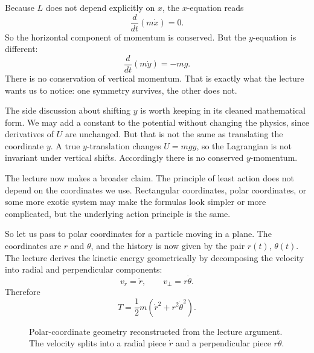 Because \(L\) does not depend explicitly on \(x\), the \(x\)-equation reads
\begin{equation}
\frac{d}{dt}(m\dot x)=0.
\end{equation}
So the horizontal component of momentum is conserved. But the \(y\)-equation is different:
\begin{equation}
\frac{d}{dt}(m\dot y)=-mg.
\end{equation}
There is no conservation of vertical momentum. That is exactly what the lecture wants us to notice: one symmetry survives, the other does not.

The side discussion about shifting \(y\) is worth keeping in its cleaned mathematical form. We may add a constant to the potential without changing the physics, since derivatives of \(U\) are unchanged. But that is not the same as translating the coordinate \(y\). A true \(y\)-translation changes \(U=mgy\), so the Lagrangian is not invariant under vertical shifts. Accordingly there is no conserved \(y\)-momentum.

The lecture now makes a broader claim. The principle of least action does not depend on the coordinates we use. Rectangular coordinates, polar coordinates, or some more exotic system may make the formulas look simpler or more complicated, but the underlying action principle is the same.

So let us pass to polar coordinates for a particle moving in a plane. The coordinates are \(r\) and \(\theta\), and the history is now given by the pair \(r(t)\), \(\theta(t)\). The lecture derives the kinetic energy geometrically by decomposing the velocity into radial and perpendicular components:
\begin{equation}
v_r=\dot r,
\qquad
v_\perp=r\dot\theta.
\end{equation}
Therefore
\begin{equation}
T=\frac12 m\left(\dot r^2+r^2\dot\theta^2\right).
\end{equation}

\begin{figure}
\centering
{}
\caption{Polar-coordinate geometry reconstructed from the lecture argument. The velocity splits into a radial piece \(\dot r\) and a perpendicular piece \(r\dot\theta\).}
\end{figure}

